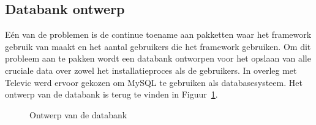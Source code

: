 \subsection{Databank ontwerp}\label{sec:databank}
Eén van de problemen is de continue toename aan pakketten waar het framework gebruik van maakt en het aantal gebruikers die het framework gebruiken.
Om dit probleem aan te pakken wordt een databank ontworpen voor het opslaan van alle cruciale data over zowel het installatieproces als de gebruikers.
In overleg met Televic werd ervoor gekozen om MySQL te gebruiken als databasesysteem.
Het ontwerp van de databank is terug te vinden in Figuur~\ref{fig:databank}.

\begin{figure}[!ht]
\centering
{}
\caption{Ontwerp van de databank}
\label{fig:databank}
\end{figure}

